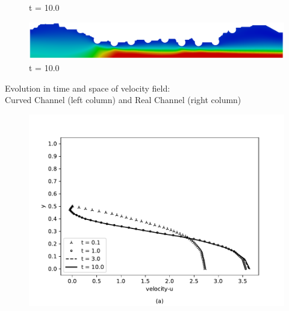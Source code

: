 \begin{frame}
\begin{figure}
\begin{minipage}{.50\linewidth}
      \tiny t = 10.0
     \end{minipage}%
     \begin{minipage}{.50\linewidth}
      \centering
      \includegraphics[scale=0.075]{images/vel_RealStrut20000.png}\\
      \tiny t = 10.0
     \end{minipage}
\end{figure}
\vspace{-0.2cm}
\centering \tiny Evolution in time and space of velocity field:\\
                 Curved Channel (left column) and Real Channel (right column)
\vspace{-0.5cm}
\begin{figure}
     \begin{minipage}{.50\linewidth}
     \medskip
      \centering
      \includegraphics[scale=0.35]{images/vel_CurvedStrut_evol.pdf}\\
     \end{minipage}%
     \begin{minipage}{.50\linewidth}
     \medskip
      \centering

\end{minipage}
\end{figure}
\end{frame}
